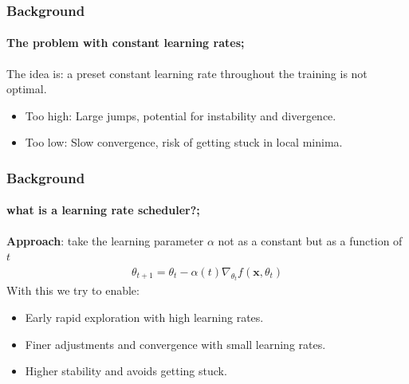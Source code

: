 \documentclass[10pt,aspectratio=169]{beamer}
\begin{document}
    \begin{frame}
        \frametitle{Background}
        \framesubtitle{The problem with constant learning rates; \cite{zhang2023dive}}
        The idea is: a preset constant learning rate throughout the training is not optimal. 
        \begin{itemize}
            \item Too high:  Large jumps, potential for instability and divergence.
            \item Too low: Slow convergence, risk of getting stuck in local minima.
        \end{itemize}
    \end{frame}

    \begin{frame}
        \frametitle{Background}
        \framesubtitle{what is a learning rate scheduler?; \cite{zhang2023dive}}
    
        \textbf{Approach}: take the learning parameter $\alpha$ not as a constant but as a function of $t$
        \begin{align*}
            \theta_{t + 1} = \theta_t - \alpha(t) \nabla_{\theta_t} f(\boldsymbol{x}, \theta_t)
        \end{align*}
        With this we try to enable:
        \begin{itemize}
            \item Early rapid exploration with high learning rates.
            \item Finer adjustments and convergence with small learning rates.
            \item Higher stability and avoids getting stuck.
        \end{itemize}
    
    \end{frame}
\end{document}
